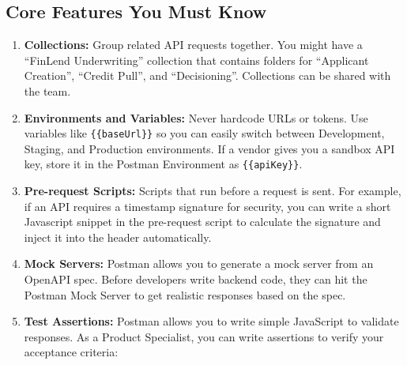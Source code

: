 \subsection{Core Features You Must
Know}\label{core-features-you-must-know}

\begin{enumerate}
\def\labelenumi{\arabic{enumi}.}
\tightlist
\item
  \textbf{Collections:} Group related API requests together. You might
  have a ``FinLend Underwriting'' collection that contains folders for
  ``Applicant Creation'', ``Credit Pull'', and ``Decisioning''.
  Collections can be shared with the team.
\item
  \textbf{Environments and Variables:} Never hardcode URLs or tokens.
  Use variables like \texttt{\{\{baseUrl\}\}} so you can easily switch
  between Development, Staging, and Production environments. If a vendor
  gives you a sandbox API key, store it in the Postman Environment as
  \texttt{\{\{apiKey\}\}}.
\item
  \textbf{Pre-request Scripts:} Scripts that run before a request is
  sent. For example, if an API requires a timestamp signature for
  security, you can write a short Javascript snippet in the pre-request
  script to calculate the signature and inject it into the header
  automatically.
\item
  \textbf{Mock Servers:} Postman allows you to generate a mock server
  from an OpenAPI spec. Before developers write backend code, they can
  hit the Postman Mock Server to get realistic responses based on the
  spec.
\item
  \textbf{Test Assertions:} Postman allows you to write simple
  JavaScript to validate responses. As a Product Specialist, you can
  write assertions to verify your acceptance criteria:
\end{enumerate}

